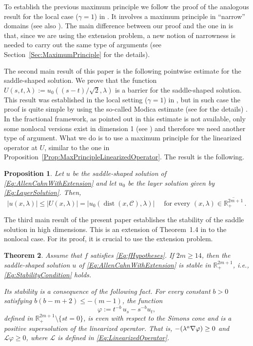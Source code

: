 \documentclass[12pt,reqno]{amsart}
\newtheorem{theorem}{Theorem}[section]
\newtheorem{proposition}[theorem]{Proposition}
\theoremstyle{definition}
\theoremstyle{remark}
\newcommand{\con}[1]{\mathbb{#1}}
\newcommand{\R}{\con{R}} %
\newcommand{\ccal}{\mathscr{C}}
\newcommand{\s}{\gamma}
\DeclareMathOperator{\dist}{dist}
\let\div\relax
\DeclareMathOperator{\div}{div}
\numberwithin{equation}{section}
\begin{document}
To establish the previous maximum principle we follow the proof of the analogous result for the local case ($\s = 1$) in \cite{Cabre-Saddle}. It involves a maximum principle in ``narrow'' domains (see also \cite{Cabre-Topics,BerestyckiNirembergVaradhan}). The main difference between our proof and the one in \cite{Cabre-Saddle} is that, since we are using the extension problem, a new notion of narrowness is needed to carry out the same type of arguments (see Section~\ref{Sec:MaximumPrinciple} for the details).




The second main result of this paper is the following pointwise estimate for the saddle-shaped solution. We prove that the function $U(s,t,\lambda) := u_0 ( (s-t)/\sqrt{2}, \lambda)$ is a barrier for the saddle-shaped solution. This result was established in the local setting ($\s = 1$) in \cite{CabreTerraI}, but in such case the proof is quite simple by using the so-called Modica estimate (see \cite{CabreTerraI} for the details) . In the fractional framework, as pointed out in this estimate is not available, only some nonlocal versions exist in dimension 1 (see \cite{CabreSolaMorales, CabreSireI}) and therefore we need another type of argument. What we do is to use a maximum principle for the linearized operator at $U$, similar to the one in Proposition~\ref{Prop:MaxPrincipleLinearizedOperator}. The result is the following.

\begin{proposition}
	\label{Prop:SaddleUnderLayer}
	Let $u$ be the saddle-shaped solution of \eqref{Eq:AllenCahnWithExtension} and let $u_0$ be the layer solution given by \eqref{Eq:LayerSolution}. Then, 
	\begin{equation}
	\label{Eq:SaddleUnderLayer}
	|u(x,\lambda)| \leq |U(x,\lambda)| = |u_0 ( \dist(x, \ccal), \lambda) | \quad \text{ for every } (x,\lambda)\in \overline{\R^{2m+1}_+}\,.
	\end{equation}
\end{proposition}



The third main result of the present paper establishes the stability of the saddle solution in high dimensions. This is an extension of Theorem~1.4 in \cite{Cabre-Saddle} to the nonlocal case. For its proof, it is crucial to use the extension problem.

\begin{theorem}
\label{Thm:Stability}
Assume that $f$ satisfies \eqref{Eq:fHypotheses}. If $2m\geq 14$, then the saddle-shaped solution $u$ of \eqref{Eq:AllenCahnWithExtension} is stable in $\R^{2m+1}_+$, i.e., \eqref{Eq:StabilityCondition} holds. 

Its stability is a consequence of the following fact. For every constant $b>0$ satisfying $b(b-m+2)\leq -(m-1)$, the function
$$
\varphi := t^{-b} \, u_s - s^{-b} u_t, 
$$
defined in $\R^{2m+1}_+\setminus\{st=0\}$, is even with respect to the Simons cone and is a positive supersolution of the linearized operator. That is, $-\div(\lambda^a \nabla \varphi) \geq 0$ and $\mathscr{L} \varphi \geq 0$, where $\mathscr{L}$ is defined in \eqref{Eq:LinearizedOperator}.
\end{theorem}
\end{document}
